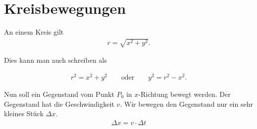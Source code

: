 \documentclass[12pt,a4paper,twoside]{article}
\def\dir{./Aufgaben_Mechanik/}
\newcommand{\Einbinden}[1]{}
\begin{document}
\Einbinden{\dir/loesen01.tex}
\Einbinden{\dir/loesen02.tex}
\Einbinden{\dir/statik_drehmomente_bruecke01.tex}


\newpage
\section*{Kreisbewegungen}

\begin{center}
	
\end{center}


An einem Kreis gilt
\begin{eqnarray*}
	r=\sqrt{x^2 + y^2}\text{.}
\end{eqnarray*}

Dies kann man auch schreiben als

\begin{eqnarray*}
	r^2 = x^2 + y^2 \qquad \text{oder} \qquad y^2=r^2-x^2\text{.}
\end{eqnarray*}

Nun soll ein Gegenstand vom Punkt $P_0$ in $x$-Richtung bewegt werden.
Der Gegenstand hat die Geschwindigkeit $v$.
Wir bewegen den Gegenstand nur ein sehr kleines Stück $\Delta x$.
\begin{eqnarray*}
	\Delta x = v\cdot \Delta t
\end{eqnarray*}
\end{document}
